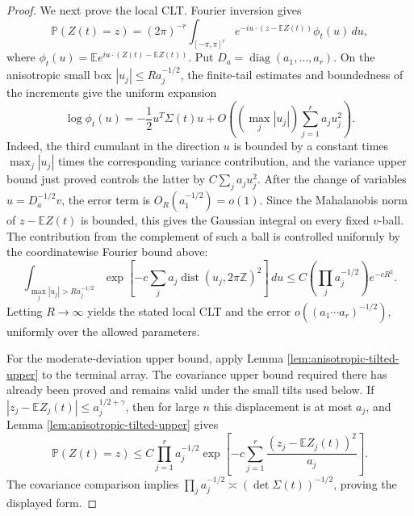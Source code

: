 \documentclass[11pt]{article}
\theoremstyle{remark}
\newcommand{\Pp}{\mathbb P}
\newcommand{\Ee}{\mathbb E}
\newcommand{\diag}{\operatorname{diag}}
\newcommand{\dd}{\,d}
\begin{document}
\begin{proof}
We next prove the local CLT.  Fourier inversion gives
\[
        \Pp(Z(t)=z)
        =(2\pi)^{-r}\int_{[-\pi,\pi]^r}
        e^{-iu\cdot(z-\Ee Z(t))}\phi_t(u)\dd u,
\]
where \(\phi_t(u)=\Ee e^{iu\cdot(Z(t)-\Ee Z(t))}\).  Put
\(D_a=\diag(a_1,\ldots,a_r)\).  On the anisotropic small box
\(|u_j|\le R a_j^{-1/2}\), the finite-tail estimates and boundedness of the increments give the uniform expansion
\[
        \log\phi_t(u)
        =-\frac12u^T\Sigma(t)u
        +O\left((\max_j |u_j|)\sum_{j=1}^r a_j u_j^2\right).
\]
Indeed, the third cumulant in the direction \(u\) is bounded by a constant times \(\max_j|u_j|\) times the corresponding variance contribution, and the variance upper bound just proved controls the latter by \(C\sum_j a_j u_j^2\).  After the change of variables \(u=D_a^{-1/2}v\), the error term is
\(O_R(a_1^{-1/2})=o(1)\).  Since the Mahalanobis norm of
\(z-\Ee Z(t)\) is bounded, this gives the Gaussian integral on every fixed \(v\)-ball.  The contribution from the complement of such a ball is controlled uniformly by the coordinatewise Fourier bound above:
\[
        \int_{\max_j |u_j|>R a_j^{-1/2}}
        \exp\left[-c\sum_j a_j\operatorname{dist}(u_j,2\pi\mathbb Z)^2\right]\dd u
        \le C\left(\prod_j a_j^{-1/2}\right)e^{-cR^2}.
\]
Letting \(R\to\infty\) yields the stated local CLT and the error
\(o((a_1\cdots a_r)^{-1/2})\), uniformly over the allowed parameters.

For the moderate-deviation upper bound, apply Lemma \ref{lem:anisotropic-tilted-upper} to the terminal array.  The covariance upper bound required there has already been proved and remains valid under the small tilts used below.  If
\(|z_j-\Ee Z_j(t)|\le a_j^{1/2+\gamma}\), then for large \(n\) this displacement is at most \(a_j\), and Lemma \ref{lem:anisotropic-tilted-upper} gives
\[
        \Pp(Z(t)=z)
        \le C\prod_{j=1}^r a_j^{-1/2}
        \exp\left[-c\sum_{j=1}^r
        \frac{(z_j-\Ee Z_j(t))^2}{a_j}\right].
\]
The covariance comparison implies
\(\prod_j a_j^{-1/2}\asymp(\det\Sigma(t))^{-1/2}\), proving the displayed form.
\end{proof}
\end{document}
